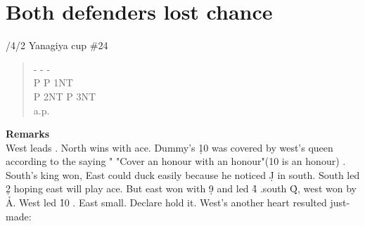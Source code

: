\section{Both defenders lost chance}
/4/2 Yanagiya cup \#24
\begin{quote}
%
  {}%
  {}%
  {}%
  {}%
\end{quote}
\begin{quote}
\begin{bidding}
- \> - \> - \d \\
P \s \>P \> 1NT \\
P \> 2NT \> P \> 3NT \\
 a.p.
\end{bidding}
 \end{quote}
{\bf Remarks}\\

West leads  . North wins with ace.
Dummy's \d 10 was covered by west's queen according to the saying "
"Cover an honour with an honour"(10 is an honour) .
South's king won, East could duck easily because he noticed \d J in south.
South led \d 2 hoping east will play ace. But east won with \d 9 and led
\h 4 .south \h Q, west won by \h A. West led \h 10 . East small. 
Declare hold it. West's another heart resulted just-made:

